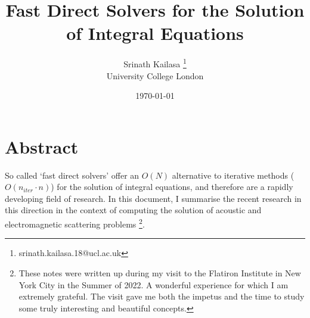 \documentclass[12pt, a4, twoside]{article}
\title{Fast Direct Solvers for the Solution of Integral Equations}
\author{Srinath Kailasa \thanks{srinath.kailasa.18@ucl.ac.uk} \\ \small University College London}
\date{\today}
\begin{document}
\maketitle

\section*{Abstract}
So called `fast direct solvers' offer an $O(N)$ alternative to iterative methods ($O(n_{iter} \cdot n)$) for the solution of integral equations, and therefore are a rapidly developing field of research. In this document, I summarise the recent research in this direction in the context of computing the solution of acoustic and electromagnetic scattering problems \footnote{These notes were written up during my visit to the Flatiron Institute in New York City in the Summer of 2022. A wonderful experience for which I am extremely grateful. The visit gave me both the impetus and the time to study some truly interesting and beautiful concepts.}.

\newpage

\tableofcontents
\end{document}
